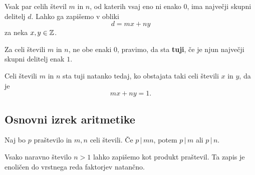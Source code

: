 \begin{izrek}
    Vsak par celih števil \(m\) in \(n\), od katerih vsaj eno ni enako \(0\), ima največji skupni delitelj \(d\). Lahko ga zapišemo v obliki
    \[d = mx+ny\]
    za neka \(x, y \in \mathbb{Z}\).
\end{izrek}

\begin{definicija}
    Za celi števili \(m\) in \(n\), ne obe enaki \(0\), pravimo, da sta \textbf{tuji}, če je njun največji skupni delitelj enak \(1\).    
\end{definicija}

\begin{posledica}
    Celi števili \(m\) in \(n\) sta tuji natanko tedaj, ko obstajata taki celi števili \(x\) in \(y\), da je 
    \[mx+ny = 1.\]
\end{posledica}

\subsection{Osnovni izrek aritmetike}
\begin{lema}
    Naj bo \(p\) praštevilo in \(m , n\) celi števili. Če \(p\, |\, mn\), potem \(p\, |\, m\) ali \(p\, | \, n\).
\end{lema}

\begin{izrek}
    Vsako naravno število \(n > 1\) lahko zapišemo kot produkt praštevil. Ta zapis je enoličen do vrstnega reda faktorjev natančno.
\end{izrek}
